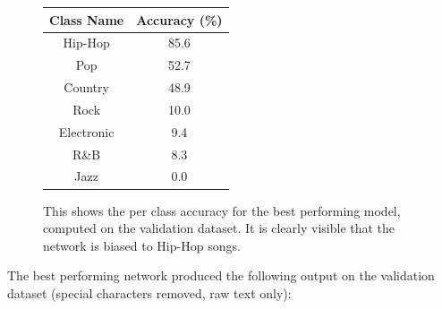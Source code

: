 \documentclass[12pt]{article}
\begin{document}
\begin{figure}
	\centering
\begin{tabular}{|c|c|}
	\hline 
	Class Name & Accuracy (\%) \\ 
	\hline 
	Hip-Hop & 85.6 \\ 
	\hline 
	Pop & 52.7 \\ 
	\hline 
	Country & 48.9 \\ 
	\hline 
	Rock & 10.0 \\ 
	\hline 
	Electronic & 9.4 \\ 
	\hline 
	R\&B & 8.3 \\ 
	\hline 
	Jazz & 0.0 \\ 
	\hline 
\end{tabular} 
\caption{This shows the per class accuracy for the best performing model, computed on the validation dataset. It is clearly visible that the network is biased to Hip-Hop songs.}
\label{tab:results}
\end{figure}

The best performing network produced the following output on the validation dataset (special characters removed, raw text only):
\end{document}
